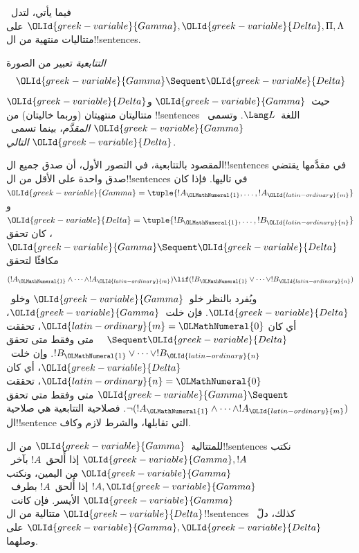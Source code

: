\documentclass[../../../include/open-logic-section]{subfiles}
\begin{document}
      {}
      {}


فيما يأتي، لتدل~$\OLId{greek-variable}{Gamma}, \OLId{greek-variable}{Delta}, \Pi, \Lambda$ على متتاليات منتهية
من ال!!{sentence}s.

\begin{defn}[التتابعية]
\emph{التتابعية} تعبير من الصورة
\[
\OLId{greek-variable}{Gamma} \Sequent \OLId{greek-variable}{Delta}
\]
حيث~$\OLId{greek-variable}{Gamma}$ و$\OLId{greek-variable}{Delta}$ متتاليتان منتهيتان (وربما خاليتان) من
!!{sentence}s اللغة~$\Lang L$. وتسمى~$\OLId{greek-variable}{Gamma}$ \emph{المقدَّم}، بينما
تسمى~$\OLId{greek-variable}{Delta}$ \emph{التالي}.
\end{defn}

\begin{explain}
المقصود بالتتابعية، في التصور الأول، أن صدق جميع ال!!{sentence}s في مقدَّمها يقتضي صدق واحدة على الأقل من ال!!{sentence}s في تاليها.
فإذا كان $\OLId{greek-variable}{Gamma} = \tuple{!A_\OLMathNumeral{1}, \dots, !A_\OLId{latin-ordinary}{m}}$ و
$\OLId{greek-variable}{Delta} = \tuple{!B_\OLMathNumeral{1}, \dots, !B_\OLId{latin-ordinary}{n}}$، كان تحقق $\OLId{greek-variable}{Gamma} \Sequent \OLId{greek-variable}{Delta}$
مكافئًا لتحقق
\[
(!A_\OLMathNumeral{1} \land \cdots \land !A_\OLId{latin-ordinary}{m}) \lif (!B_\OLMathNumeral{1} \lor \cdots \lor
!B_\OLId{latin-ordinary}{n})
\]
ويُفرد بالنظر خلو~$\OLId{greek-variable}{Gamma}$ وخلو~$\OLId{greek-variable}{Delta}$.
فإن خلت~$\OLId{greek-variable}{Gamma}$، أي كان $\OLId{latin-ordinary}{m} = \OLMathNumeral{0}$، تحققت $\quad
\Sequent \OLId{greek-variable}{Delta}$ متى وفقط متى تحقق
$!B_\OLMathNumeral{1} \lor \dots \lor !B_\OLId{latin-ordinary}{n}$.
وإن خلت~$\OLId{greek-variable}{Delta}$، أي كان $\OLId{latin-ordinary}{n} = \OLMathNumeral{0}$، تحققت $\OLId{greek-variable}{Gamma} \Sequent \quad$
متى وفقط متى تحقق
$\lnot(!A_\OLMathNumeral{1} \land \dots \land !A_\OLId{latin-ordinary}{m})$.
فصلاحية التتابعية هي صلاحية ال!!{sentence} التي تقابلها، والشرط لازم وكاف.
\end{explain}

للمتتالية~$\OLId{greek-variable}{Gamma}$ من ال!!{sentence}s نكتب $\OLId{greek-variable}{Gamma}, !A$
إذا أُلحق~$!A$ بآخر~$\OLId{greek-variable}{Gamma}$ من اليمين، ونكتب $!A, \OLId{greek-variable}{Gamma}$
إذا أُلحق~$!A$ بطرف~$\OLId{greek-variable}{Gamma}$ الأيسر. فإن كانت~$\OLId{greek-variable}{Delta}$
متتالية من ال!!{sentence}s كذلك، دلّ~$\OLId{greek-variable}{Gamma}, \OLId{greek-variable}{Delta}$ على وصلهما.
\end{document}
